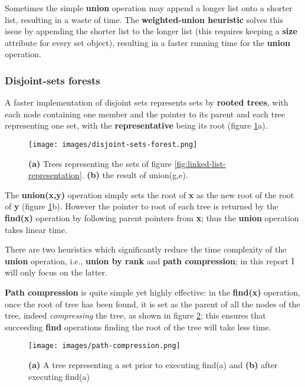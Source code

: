 \documentclass[11pt]{article}
\begin{document}
    Sometimes the simple \textbf{union} operation may append a longer list onto a shorter list, resulting in a waste of time. The \textbf{weighted-union heuristic} solves this issue by appending the shorter list to the longer list (this requires keeping a \textbf{size} attribute for every set object), resulting in a faster running time for the \textbf{union} operation.

    \subsubsection{Disjoint-sets forests}\label{subsubsec:disjoint-set-forests}
    A faster implementation of disjoint sets represents sets by \textbf{rooted trees}, with each node containing one member and the pointer to its parent and each tree representing one set, with the \textbf{representative} being its root (figure \ref{fig:disjoint-sets-forest}a).

    \begin{figure}[H]
        \centering
        \texttt{[image: images/disjoint-sets-forest.png]}
        \caption{\textbf{(a)} Trees representing the sets of figure \ref{fig:linked-list-representation}. \textbf{(b)} the result of union(g,e).}
        \label{fig:disjoint-sets-forest}
    \end{figure}
    
    The \textbf{union(x,y)} operation simply sets the root of \textbf{x} as the new root of the root of \textbf{y} (figure \ref{fig:disjoint-sets-forest}b). However the pointer to root of each tree is returned by the \textbf{find(x)} operation by following parent pointers from \textbf{x}; thus the \textbf{union} operation takes linear time.

    There are two heuristics which significantly reduce the time complexity of the \textbf{union} operation, i.e., \textbf{union by rank} and \textbf{path compression}; in this report I will only focus on the latter.

    \textbf{Path compression} is quite simple yet highly effective: in the \textbf{find(x)} operation, once the root of tree has been found, it is set as the parent of all the nodes of the tree, indeed \textit{compressing} the tree, as shown in figure \ref{fig:path-compression}; this ensures that succeeding \textbf{find} operations finding the root of the tree will take less time.  

    \begin{figure}[H]
        \centering
        \texttt{[image: images/path-compression.png]}
        \caption{\textbf{(a)} A tree representing a set prior to executing find(a) and \textbf{(b)} after executing find(a)}
        \label{fig:path-compression}
    \end{figure}
\end{document}
